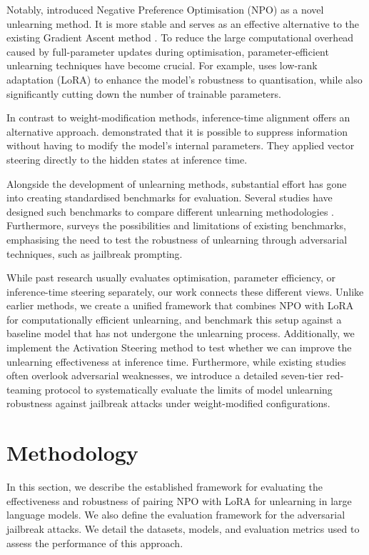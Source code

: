\documentclass[10pt, a4paper]{article}
\begin{document}
Notably, \citet{zhang2024negative} introduced Negative Preference Optimisation (NPO) as a novel unlearning method. It is more stable and serves as an effective alternative to the existing Gradient Ascent method \citep{yao2024large}. To reduce the large computational overhead caused by full-parameter updates during optimisation, parameter-efficient unlearning techniques have become crucial. For example, \citet{abitante2026quantization} uses low-rank adaptation (LoRA) to enhance the model's robustness to quantisation, while also significantly cutting down the number of trainable parameters.

In contrast to weight-modification methods, inference-time alignment offers an alternative approach. \citet{turani2026inference} demonstrated that it is possible to suppress information without having to modify the model's internal parameters. They applied vector steering directly to the hidden states at inference time.

Alongside the development of unlearning methods, substantial effort has gone into creating standardised benchmarks for evaluation. Several studies have designed such benchmarks to compare different unlearning methodologies \citep{maini2024tofu,shi2025muse,anna2026anatomy}. Furthermore, \citet{lynch2024eight} surveys the possibilities and limitations of existing benchmarks, emphasising the need to test the robustness of unlearning through adversarial techniques, such as jailbreak prompting.

While past research usually evaluates optimisation, parameter efficiency, or inference-time steering separately, our work connects these different views. Unlike earlier methods, we create a unified framework that combines NPO with LoRA for computationally efficient unlearning, and benchmark this setup against a baseline model that has not undergone the unlearning process. Additionally, we implement the Activation Steering method to test whether we can improve the unlearning effectiveness at inference time. Furthermore, while existing studies often overlook adversarial weaknesses, we introduce a detailed seven-tier red-teaming protocol to systematically evaluate the limits of model unlearning robustness against jailbreak attacks under weight-modified configurations.

\section{Methodology}
In this section, we describe the established framework for evaluating the effectiveness and robustness of pairing NPO with LoRA for unlearning in large language models. We also define the evaluation framework for the adversarial jailbreak attacks. We detail the datasets, models, and evaluation metrics used to assess the performance of this approach.
\end{document}
